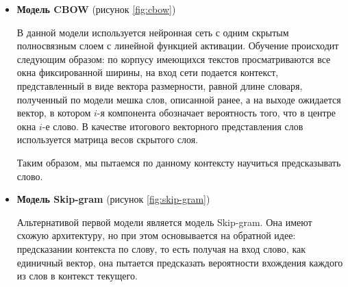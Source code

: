 \documentclass[../diploma.tex]{subfiles}
\begin{document}
	\begin{itemize}
		\item
		\textbf{Модель CBOW} (рисунок \ref{fig:cbow}) 

		В данной модели используется нейронная сеть с одним скрытым полносвязным слоем с линейной функцией активации.
		Обучение происходит следующим образом: по корпусу имеющихся текстов просматриваются все окна фиксированной ширины, 
		на вход сети подается контекст, представленный в виде вектора размерности, равной длине словаря, полученный по модели мешка слов, описанной ранее, 
		а на выходе ожидается вектор, в котором $i$-я компонента обозначает вероятность того, что в центре окна $i$-е слово.
		В качестве итогового векторного представления слов используется матрица весов скрытого слоя.

		Таким образом, мы пытаемся по данному контексту научиться предсказывать слово.
		
		\item
		\textbf{Модель Skip-gram} (рисунок \ref{fig:skip-gram}) 

		Альтернативой первой модели является модель Skip-gram.
		Она имеют схожую архитектуру, но при этом основывается на обратной идее: предсказании контекста по слову, 
		то есть получая на вход слово, как единичный вектор, она пытается предсказать вероятности вхождения каждого из слов в контекст текущего.			
	\end{itemize}
\end{document}
